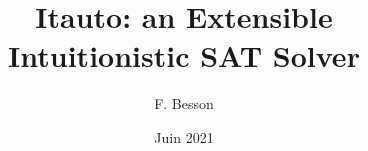 \documentclass{beamer}
\title{Itauto: an Extensible\\ Intuitionistic SAT Solver }
\author{F. Besson}
\institute{Celtique/Inria/Univ Rennes}
\date{Juin 2021}
\begin{document}

\begin{frame}
  \maketitle
\end{frame}

\end{document}
